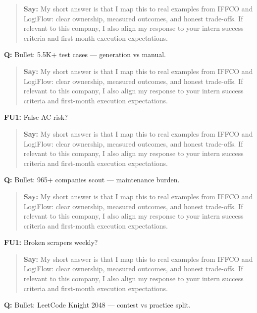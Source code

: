 \documentclass[9pt,a4paper]{article}
\begin{document}
\begin{quote}\small\textbf{Say:} My short answer is that I map this to real examples from IFFCO and LogiFlow: clear ownership, measured outcomes, and honest trade-offs. If relevant to this company, I also align my response to your intern success criteria and first-month execution expectations.\end{quote}
\vspace{2mm}
\textbf{Q:} Bullet: 5.5K+ test cases --- generation vs manual.

\begin{quote}\small\textbf{Say:} My short answer is that I map this to real examples from IFFCO and LogiFlow: clear ownership, measured outcomes, and honest trade-offs. If relevant to this company, I also align my response to your intern success criteria and first-month execution expectations.\end{quote}
\vspace{2mm}
\textbf{FU1:} False AC risk?

\begin{quote}\small\textbf{Say:} My short answer is that I map this to real examples from IFFCO and LogiFlow: clear ownership, measured outcomes, and honest trade-offs. If relevant to this company, I also align my response to your intern success criteria and first-month execution expectations.\end{quote}
\vspace{2mm}
\textbf{Q:} Bullet: 965+ companies scout --- maintenance burden.

\begin{quote}\small\textbf{Say:} My short answer is that I map this to real examples from IFFCO and LogiFlow: clear ownership, measured outcomes, and honest trade-offs. If relevant to this company, I also align my response to your intern success criteria and first-month execution expectations.\end{quote}
\vspace{2mm}
\textbf{FU1:} Broken scrapers weekly?

\begin{quote}\small\textbf{Say:} My short answer is that I map this to real examples from IFFCO and LogiFlow: clear ownership, measured outcomes, and honest trade-offs. If relevant to this company, I also align my response to your intern success criteria and first-month execution expectations.\end{quote}
\vspace{2mm}
\textbf{Q:} Bullet: LeetCode Knight 2048 --- contest vs practice split.
\end{document}
